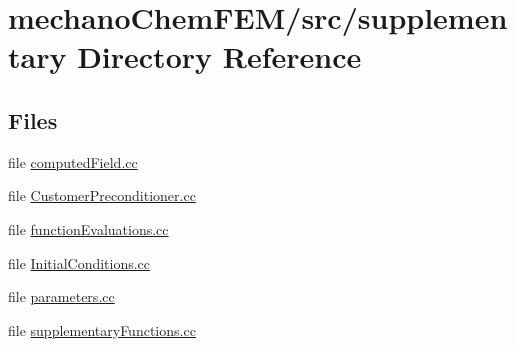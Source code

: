 \section{mechano\+Chem\+F\+E\+M/src/supplementary Directory Reference}
\label{dir_c90701abf2b957e4dad90d74dd66ad6d}
\subsection*{Files}
\begin{DoxyCompactItemize}
\item 
file \mbox{\hyperlink{computed_field_8cc}{computed\+Field.\+cc}}
\item 
file \mbox{\hyperlink{_customer_preconditioner_8cc}{Customer\+Preconditioner.\+cc}}
\item 
file \mbox{\hyperlink{function_evaluations_8cc}{function\+Evaluations.\+cc}}
\item 
file \mbox{\hyperlink{_initial_conditions_8cc}{Initial\+Conditions.\+cc}}
\item 
file \mbox{\hyperlink{parameters_8cc}{parameters.\+cc}}
\item 
file \mbox{\hyperlink{supplementary_functions_8cc}{supplementary\+Functions.\+cc}}
\end{DoxyCompactItemize}
